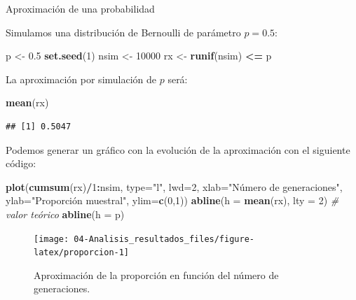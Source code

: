 \documentclass[]{book}
\newenvironment{Shaded}{\begin{snugshade}}{\end{snugshade}}
\newcommand{\KeywordTok}[1]{\textcolor[rgb]{0.13,0.29,0.53}{\textbf{#1}}}
\newcommand{\DataTypeTok}[1]{\textcolor[rgb]{0.13,0.29,0.53}{#1}}
\newcommand{\DecValTok}[1]{\textcolor[rgb]{0.00,0.00,0.81}{#1}}
\newcommand{\FloatTok}[1]{\textcolor[rgb]{0.00,0.00,0.81}{#1}}
\newcommand{\StringTok}[1]{\textcolor[rgb]{0.31,0.60,0.02}{#1}}
\newcommand{\CommentTok}[1]{\textcolor[rgb]{0.56,0.35,0.01}{\textit{#1}}}
\newcommand{\OperatorTok}[1]{\textcolor[rgb]{0.81,0.36,0.00}{\textbf{#1}}}
\newcommand{\NormalTok}[1]{#1}
\theoremstyle{definition}
\theoremstyle{definition}
\theoremstyle{definition}
\theoremstyle{remark}
\let\BeginKnitrBlock\begin \let\EndKnitrBlock\end
\begin{document}
\BeginKnitrBlock{example}
\protect\hypertarget{exm:unnamed-chunk-2}{}{\label{exm:unnamed-chunk-2}
}Aproximación de una probabilidad
\EndKnitrBlock{example} Simulamos una distribución de Bernoulli de
parámetro \(p=0.5\):

\begin{Shaded}
\begin{Highlighting}[]
\NormalTok{p <-}\StringTok{ }\FloatTok{0.5}
\KeywordTok{set.seed}\NormalTok{(}\DecValTok{1}\NormalTok{)}
\NormalTok{nsim <-}\StringTok{ }\DecValTok{10000}
\NormalTok{rx <-}\StringTok{ }\KeywordTok{runif}\NormalTok{(nsim) }\OperatorTok{<=}\StringTok{ }\NormalTok{p}
\end{Highlighting}
\end{Shaded}

La aproximación por simulación de \(p\) será:

\begin{Shaded}
\begin{Highlighting}[]
\KeywordTok{mean}\NormalTok{(rx) }
\end{Highlighting}
\end{Shaded}

\begin{verbatim}
## [1] 0.5047
\end{verbatim}

Podemos generar un gráfico con la evolución de la aproximación con el
siguiente código:

\begin{Shaded}
\begin{Highlighting}[]
\KeywordTok{plot}\NormalTok{(}\KeywordTok{cumsum}\NormalTok{(rx)}\OperatorTok{/}\DecValTok{1}\OperatorTok{:}\NormalTok{nsim, }\DataTypeTok{type=}\StringTok{"l"}\NormalTok{, }\DataTypeTok{lwd=}\DecValTok{2}\NormalTok{, }\DataTypeTok{xlab=}\StringTok{"Número de generaciones"}\NormalTok{, }
     \DataTypeTok{ylab=}\StringTok{"Proporción muestral"}\NormalTok{, }\DataTypeTok{ylim=}\KeywordTok{c}\NormalTok{(}\DecValTok{0}\NormalTok{,}\DecValTok{1}\NormalTok{))}
\KeywordTok{abline}\NormalTok{(}\DataTypeTok{h =} \KeywordTok{mean}\NormalTok{(rx), }\DataTypeTok{lty =} \DecValTok{2}\NormalTok{)}
\CommentTok{# valor teórico}
\KeywordTok{abline}\NormalTok{(}\DataTypeTok{h =}\NormalTok{ p) }
\end{Highlighting}
\end{Shaded}

\begin{figure}[!htb]

{\centering \texttt{[image: 04-Analisis\_resultados\_files/figure-latex/proporcion-1]} 

}

\caption{Aproximación de la proporción en función del número de generaciones.}\label{fig:proporcion}
\end{figure}
\end{document}
